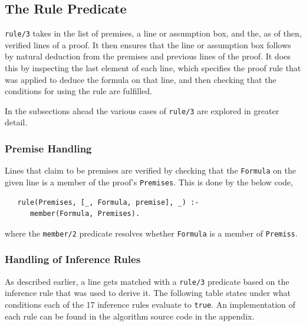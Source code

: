 \documentclass[a4paper, 11pt]{article}
\begin{document}
   \subsection{The Rule Predicate}
   \texttt{rule/3} takes in the list of premises, a
   line or assumption box, and the, as of then, 
   verified lines of a proof. It then ensures that
   the line or assumption box follows by natural
   deduction from the premises and previous lines of
   the proof. It does this by inspecting the last
   element of each line, which specifies the
   proof rule that was applied to deduce the
   formula on that line, and then checking that the
   conditions for using the rule are fulfilled.
   \bigbreak

   In the subsections ahead the various cases of
   \texttt{rule/3} are explored in greater detail.

   \subsubsection{Premise Handling}
   \label{premise-handling}
   Lines that claim to be premises are verified by checking
   that the \texttt{Formula} on the given line is a member of 
   the proof's \texttt{Premises}. This is done by the below
   code, 
   
\begin{verbatim}
   rule(Premises, [_, Formula, premise], _) :-
      member(Formula, Premises).
\end{verbatim}

   where the \texttt{member/2} predicate resolves
   whether \texttt{Formula} is a member of \texttt{Premiss}. 

   \subsubsection{Handling of Inference Rules}
   \label{handling-of-inference-rules}

   As described earlier, a line gets matched with a 
   \texttt{rule/3} predicate based on the inference rule that 
   was used to derive it. The following table states under 
   what conditions each of the 17 inference rules evaluate to
   \texttt{true}. An implementation of each rule can be found
   in the algorithm source code in the appendix.
   \bigbreak
\end{document}
